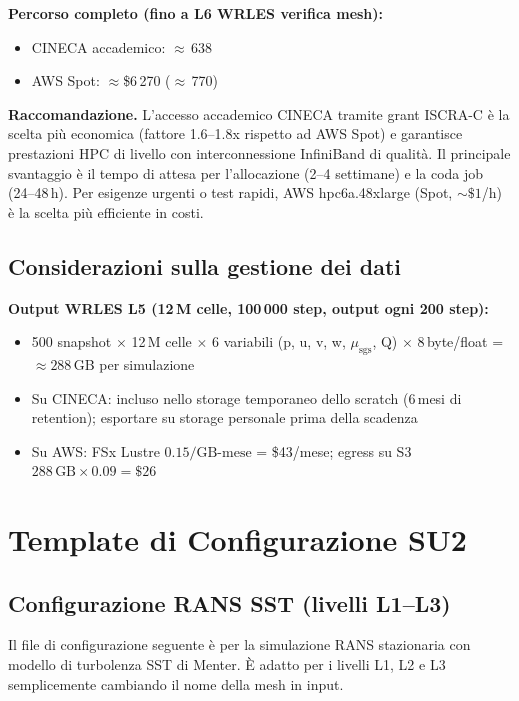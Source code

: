 \documentclass[11pt,a4paper]{article}
\begin{document}
\textbf{Percorso completo (fino a L6 WRLES verifica mesh):}
\begin{itemize}
  \item CINECA accademico: $\approx$\,638
  \item AWS Spot: $\approx$\$6\,270 ($\approx$\,770)
\end{itemize}

\textbf{Raccomandazione.} L'accesso accademico CINECA tramite grant ISCRA-C è la scelta più economica (fattore 1.6--1.8x rispetto ad AWS Spot) e garantisce prestazioni HPC di livello con interconnessione InfiniBand di qualità. Il principale svantaggio è il tempo di attesa per l'allocazione (2--4 settimane) e la coda job (24--48\,h). Per esigenze urgenti o test rapidi, AWS hpc6a.48xlarge (Spot, $\sim\$1$/h) è la scelta più efficiente in costi.

\subsection{Considerazioni sulla gestione dei dati}

\textbf{Output WRLES L5 (12\,M celle, 100\,000 step, output ogni 200 step):}
\begin{itemize}
  \item 500 snapshot $\times$ 12\,M celle $\times$ 6 variabili (p, u, v, w, $\mu_{\mathrm{sgs}}$, Q) $\times$ 8\,byte/float = $\approx 288$\,GB per simulazione
  \item Su CINECA: incluso nello storage temporaneo dello scratch (6\,mesi di retention); esportare su storage personale prima della scadenza
  \item Su AWS: FSx Lustre $0.15/\text{GB-mese}$ = \$43/mese; egress su S3 $288\,\text{GB} \times 0.09 = \$26$
\end{itemize}

\section{Template di Configurazione SU2}
\label{sec:config}

\subsection{Configurazione RANS SST (livelli L1--L3)}

Il file di configurazione seguente è per la simulazione RANS stazionaria con modello di turbolenza SST di Menter. È adatto per i livelli L1, L2 e L3 semplicemente cambiando il nome della mesh in input.
\end{document}
